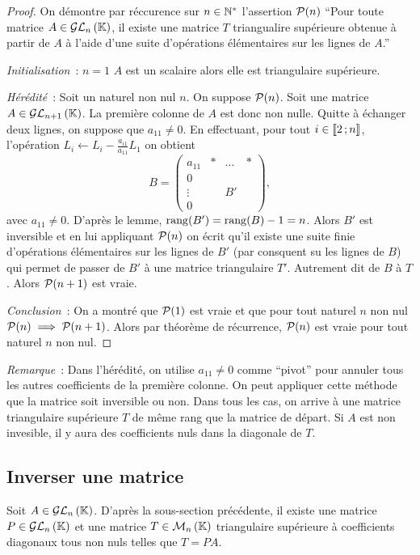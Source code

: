 \begin{proof}
  On démontre par réccurence sur \(n \in \N^*\) l'assertion \(\P(n)\) ``Pour 
  toute matrice \(A \in \GLn{n}{\K}\), il existe une matrice \(T\) triangualire 
  supérieure obtenue à partir de \(A\) à l'aide d'une suite d'opérations 
  élémentaires sur les lignes de \(A\).''

  \emph{Initialisation}~: \(n = 1\) \(A\) est un scalaire alors elle est 
  triangulaire supérieure.

  \emph{Hérédité}~: Soit un naturel non nul \(n\). On suppose \(\P(n)\). Soit 
  une matrice \(A \in \GLn{n+1}{\K}\). La première colonne de \(A\) est donc non 
  nulle. Quitte à échanger deux lignes, on suppose que \(a_{11}\neq 0\). En 
  effectuant, pour tout \(i \in \intervalleentier{2}{n}\), l'opération \(L_i 
  \leftarrow L_i -\frac{a_{i1}}{a_{11}}L_1\) on obtient
  \begin{equation}
    B = \begin{pmatrix}
      a_{11} & * & \ldots & * \\
      0 & & & \\
      \vdots & & B' & \\
    0 & & & \end{pmatrix},
  \end{equation}
  avec \(a_{11}\neq 0\). D'après le lemme, \(\rg(B')=\rg(B)-1 = n\). Alors 
  \(B'\) est inversible et en lui appliquant \(\P(n)\) on écrit qu'il existe une 
  suite finie d'opérations élémentaires sur les lignes de \(B'\) (par consquent 
  su les lignes de \(B\)) qui permet de passer de \(B'\) à une matrice 
  triangulaire \(T'\). Autrement dit de \(B\) à \(T\). Alors \(\P(n+1)\) est 
  vraie.

  \emph{Conclusion}~: On a montré que \(\P(1)\) est vraie et que pour tout 
  naturel \(n\) non nul \(\P(n) \implies \P(n+1)\). Alors par théorème de 
  récurrence, \(\P(n)\) est vraie pour tout naturel \(n\) non nul.
\end{proof}

\emph{Remarque}~: Dans l'hérédité, on utilise \(a_{11}\neq 0\) comme ``pivot'' 
pour annuler tous les autres coefficients de la première colonne. On peut 
appliquer cette méthode que la matrice soit inversible ou non. Dans tous les 
cas, on arrive à  une matrice triangulaire supérieure \(T\) de même rang que la 
matrice de départ. Si \(A\) est non invesible, il y aura des coefficients nuls 
dans la diagonale de \(T\).

\subsection{Inverser une matrice}
Soit \(A \in \GLn{n}{\K}\). D'après la sous-section précédente, il existe une 
matrice \(P \in \GLn{n}{\K}\) et une matrice \(T \in \Mn{n}{\K}\) triangulaire 
supérieure à coefficients diagonaux tous non nuls telles que \(T = PA\).


